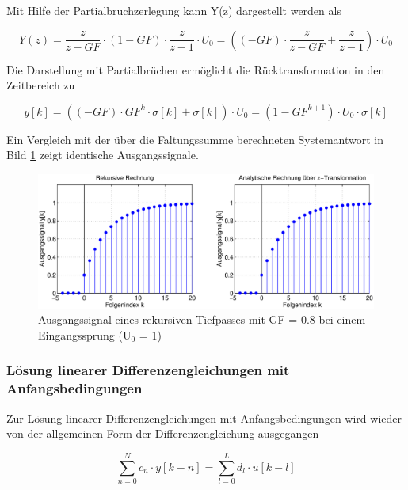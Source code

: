 \noindent Mit Hilfe der Partialbruchzerlegung kann Y(z) dargestellt werden als 

\begin{equation}\label{eq:sixnine}
Y\left(z\right)=\frac{z}{z-GF} \cdot \left(1-GF\right)\cdot \frac{z}{z-1} \cdot U_{0} =\left(\left(-GF\right)\cdot \frac{z}{z-GF} +\frac{z}{z-1} \right)\cdot U_{0}
\end{equation}

\noindent Die Darstellung mit Partialbr\"{u}chen erm\"{o}glicht die R\"{u}cktransformation in den Zeitbereich zu

\begin{equation}\label{eq:sixten}
y\left[k\right]=\left(\left(-GF\right)\cdot GF^{k} \cdot \sigma \left[k\right]+\sigma \left[k\right]\right)\cdot U_{0} =\left(1-GF^{k+1} \right)\cdot U_{0} \cdot \sigma \left[k\right]
\end{equation}

\noindent Ein Vergleich mit der \"{u}ber die Faltungssumme berechneten Systemantwort in Bild \ref{fig:DifferenzengleichungOhneAnfangsbedingungen} zeigt identische Ausgangssignale.

\begin{figure}[H]
  \centerline{\includegraphics[width=1\textwidth]{Kapitel6/Bilder/image2.eps}}
  \caption{Ausgangssignal eines rekursiven Tiefpasses mit GF = 0.8 bei einem Eingangssprung (U${}_{0}$ = 1)}
  \label{fig:DifferenzengleichungOhneAnfangsbedingungen}
\end{figure}

\subsubsection{L\"{o}sung linearer Differenzengleichungen mit Anfangsbedingungen}

\noindent Zur L\"{o}sung linearer Differenzengleichungen mit Anfangsbedingungen wird wieder von der allgemeinen Form der Differenzengleichung ausgegangen

\begin{equation}\label{eq:sixeleven}
\sum _{n=0}^{N}c_{n} \cdot y\left[k-n\right] =\sum _{l=0}^{L}d_{l} \cdot u\left[k-l\right]
\end{equation}

